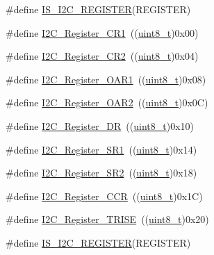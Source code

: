 \begin{DoxyCompactItemize}
\item 
\#define \hyperlink{group___i2_c__registers_ga37206b258f7930065c308ec7d35f243e}{I\+S\+\_\+\+I2\+C\+\_\+\+R\+E\+G\+I\+S\+T\+ER}(R\+E\+G\+I\+S\+T\+ER)
\item 
\#define \hyperlink{group___i2_c__registers_ga4b9e7934e490c3540e50cf2f1d0a7688}{I2\+C\+\_\+\+Register\+\_\+\+C\+R1}~((\hyperlink{_p_e___types_8h_aba7bc1797add20fe3efdf37ced1182c5}{uint8\+\_\+t})0x00)
\item 
\#define \hyperlink{group___i2_c__registers_gaf278337dd03b6ae56eac3f335381eca3}{I2\+C\+\_\+\+Register\+\_\+\+C\+R2}~((\hyperlink{_p_e___types_8h_aba7bc1797add20fe3efdf37ced1182c5}{uint8\+\_\+t})0x04)
\item 
\#define \hyperlink{group___i2_c__registers_ga706317a00c0d450e95c00efd2afe1836}{I2\+C\+\_\+\+Register\+\_\+\+O\+A\+R1}~((\hyperlink{_p_e___types_8h_aba7bc1797add20fe3efdf37ced1182c5}{uint8\+\_\+t})0x08)
\item 
\#define \hyperlink{group___i2_c__registers_gaffdc1902493456dea95216a39fc54e2b}{I2\+C\+\_\+\+Register\+\_\+\+O\+A\+R2}~((\hyperlink{_p_e___types_8h_aba7bc1797add20fe3efdf37ced1182c5}{uint8\+\_\+t})0x0\+C)
\item 
\#define \hyperlink{group___i2_c__registers_gaea281721e7a8461d90bf59898487c096}{I2\+C\+\_\+\+Register\+\_\+\+DR}~((\hyperlink{_p_e___types_8h_aba7bc1797add20fe3efdf37ced1182c5}{uint8\+\_\+t})0x10)
\item 
\#define \hyperlink{group___i2_c__registers_gaf3bc5f4dc87513e2eceba4f503c14d6a}{I2\+C\+\_\+\+Register\+\_\+\+S\+R1}~((\hyperlink{_p_e___types_8h_aba7bc1797add20fe3efdf37ced1182c5}{uint8\+\_\+t})0x14)
\item 
\#define \hyperlink{group___i2_c__registers_ga0b5f7949e449223ec97e0169d79d007d}{I2\+C\+\_\+\+Register\+\_\+\+S\+R2}~((\hyperlink{_p_e___types_8h_aba7bc1797add20fe3efdf37ced1182c5}{uint8\+\_\+t})0x18)
\item 
\#define \hyperlink{group___i2_c__registers_ga7a0de765650408f3915b54141f052c5b}{I2\+C\+\_\+\+Register\+\_\+\+C\+CR}~((\hyperlink{_p_e___types_8h_aba7bc1797add20fe3efdf37ced1182c5}{uint8\+\_\+t})0x1\+C)
\item 
\#define \hyperlink{group___i2_c__registers_ga488c25a0a9f2c572af28768589fcbab2}{I2\+C\+\_\+\+Register\+\_\+\+T\+R\+I\+SE}~((\hyperlink{_p_e___types_8h_aba7bc1797add20fe3efdf37ced1182c5}{uint8\+\_\+t})0x20)
\item 
\#define \hyperlink{group___i2_c__registers_ga37206b258f7930065c308ec7d35f243e}{I\+S\+\_\+\+I2\+C\+\_\+\+R\+E\+G\+I\+S\+T\+ER}(R\+E\+G\+I\+S\+T\+ER)
\end{DoxyCompactItemize}


